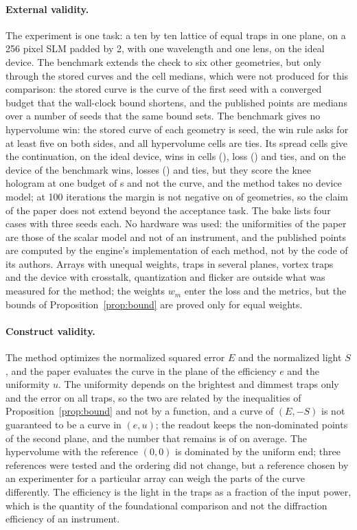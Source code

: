 \paragraph{External validity.} The experiment is one task: a ten by ten lattice of equal traps in one plane, on a 256 pixel SLM padded by 2, with one wavelength and one lens, on the ideal device. The benchmark extends the check to six other geometries, but only through the stored curves and the cell medians, which were not produced for this comparison: the stored curve is the curve of the first seed with a converged budget that the wall-clock bound shortens, and the published points are medians over a number of seeds that
the same bound sets. The benchmark gives no hypervolume win: the stored curve of each geometry is \benchSeedsFrontThirty{} seed, the win rule asks for at least five on both sides, and all \benchCells{} hypervolume cells are ties. Its spread cells give the continuation, on the ideal device, \spreadWins{} wins in \spreadCells{} cells (\spreadWinList{}), \spreadLosses{} loss (\spreadLossList{}) and \spreadTies{} ties, and on the device of the benchmark \spreadDevWins{} wins, \spreadDevLosses{} losses (\spreadDevLossList{}) and \spreadDevTies{} ties, but they score the knee hologram at one budget of \spreadBudget{} s and not the curve, and the method takes no device model; at 100 iterations the margin is not negative on \benchPassHundred{} of \benchNHundred{} geometries, so the claim of the paper does not extend beyond the acceptance task. The bake lists four cases with three seeds each. No hardware was used: the uniformities of the paper are those of the scalar model and not of an instrument, and the published points are computed by the engine's implementation of each method, not by the code of its authors.
Arrays with unequal weights, traps in several planes, vortex traps and the device with crosstalk, quantization and flicker are outside what was measured for the method; the weights $w_m$ enter the loss and the metrics, but the bounds of Proposition~\ref{prop:bound} are proved only for equal weights.

\paragraph{Construct validity.} The method optimizes the normalized squared error $E$ and the normalized light $S$, and the paper evaluates the curve in the plane of the efficiency $e$ and the uniformity $u$. The uniformity depends on the brightest and dimmest traps only and the error on all traps, so the two are related by the inequalities of Proposition~\ref{prop:bound} and not by a function, and a curve of $(E,-S)$ is not guaranteed to be a curve in $(e,u)$; the readout keeps the non-dominated points of the second plane, and
the number that remains is \nParetoMean{} of \nLambda{} on average. The hypervolume with the reference $(0,0)$ is dominated by the uniform end; three references were tested and the ordering did not change, but a reference chosen by an experimenter for a particular array can weigh the parts of the curve differently. The efficiency is the light in the traps as a fraction of the input power, which is the quantity of the foundational comparison and not the diffraction efficiency of an instrument.


